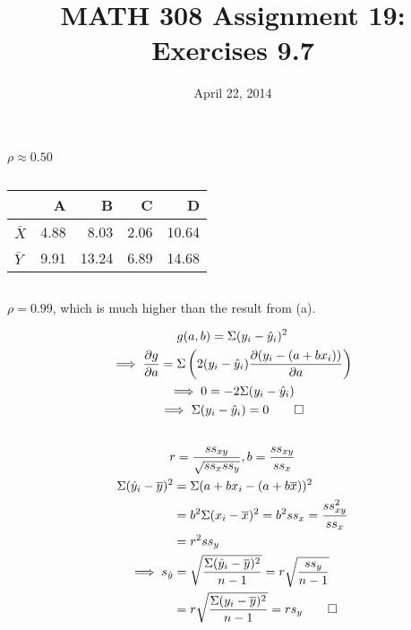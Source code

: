 \documentclass[twocolumn]{article}
\title{MATH 308 Assignment 19:\\Exercises 9.7}
\date{April 22, 2014}
\begin{document}
\maketitle

\subsection{}
$\rho\approx0.50$
\subsection{}
\begin{table}[h]\centering
\begin{tabular}{@{}lrrrr@{}}
\toprule
  & A    & B     & C    & D     \\ \midrule
$\bar X$ & 4.88 & 8.03  & 2.06 & 10.64 \\
$\bar Y$ & 9.91 & 13.24 & 6.89 & 14.68 \\ \bottomrule
\end{tabular}
\end{table}
\subsection{}
$\rho=0.99$, which is much higher than the result from (a).

\begin{gather*}
g(a,b)=\Sigma(y_i-\hat y_i)^2\\
\implies \frac{\partial g}{\partial a}
=\Sigma \left(2(y_i-\hat y_i)\frac{\partial (y_i-(a+bx_i))}{\partial a}\right)\\
\implies 0=-2\Sigma (y_i-\hat y_i)\\
\implies \Sigma (y_i-\hat y_i)=0 \qed
\end{gather*}


\subsection{}

\begin{gather*}
r=\frac{ss_{xy}}{\sqrt{ss_x ss_y}}, b=\frac{ss_{xy}}{ss_x}\\
\begin{aligned}
\Sigma(\hat y_i-\bar y)^2&=\Sigma(a+bx_i-(a+b\bar x))^2\\
&=b^2\Sigma(x_i-\bar x)^2=b^2 ss_x
=\frac{ss_{xy}^2}{ss_x}\\
&=r^2ss_y\\
\implies s_{\hat y}
&=\sqrt{
	\frac{\Sigma(\hat y_i-\bar y)^2}
	{n-1}}
=r\sqrt{\frac{ss_y}{n-1}}\\
&=r\sqrt{
	\frac{\Sigma(y_i-\bar y)^2}
	{n-1}
}=rs_y\qed
\end{aligned}
\end{gather*}
\end{document}
